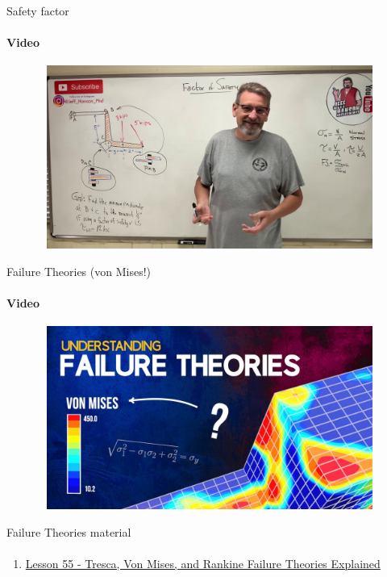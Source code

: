 \documentclass[aspectratio=169]{beamer}
\begin{document}
\begin{frame}[t]{Safety factor}
    \framesubtitle{Video}
    \vspace{-0.6cm}
    \begin{figure}[H]
        \href{https://www.youtube.com/watch?v=7s06qpjaUJA&list=PLRqDfxcafc21wlI3E56IkDmRJ-33apMjv&index=8}{
            \centering\includegraphics[height=6cm,width=1\textwidth,keepaspectratio]{safety_factor_video.jpg}}
        \label{fig:safety_factor_video.jpg}
    \end{figure}
\end{frame}

\begin{frame}[t]{Failure Theories (von Mises!)}
    \framesubtitle{Video}
    \vspace{-0.6cm}
    \begin{figure}[H]
        \href{https://youtu.be/xkbQnBAOFEg}{
            \centering\includegraphics[height=6cm,width=1\textwidth,keepaspectratio]{failure_theories_video.jpg}}
        \label{fig:failure_theories_video.jpg}
    \end{figure}
\end{frame}

\begin{frame}[t]{Failure Theories material}
    \framesubtitle{}
    \begin{enumerate}
        \item \href{https://www.youtube.com/watch?v=QV6xB0bLJwM&list=PLRqDfxcafc21wlI3E56IkDmRJ-33apMjv&index=64&t=183s}{Lesson 55 - Tresca, Von Mises, and Rankine Failure Theories Explained}
    \end{enumerate}
    \end{frame}
\end{document}
